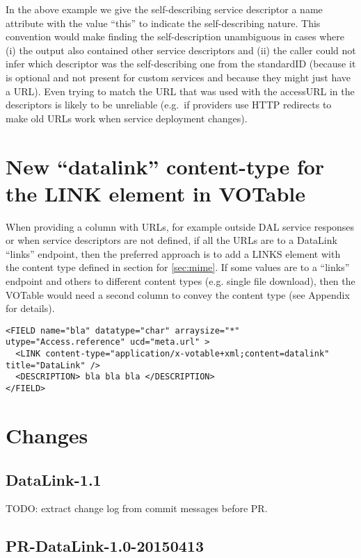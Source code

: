 \documentclass[11pt,a4paper]{ivoa}
\begin{document}
In the above example we give the self-describing service descriptor a
name attribute with the value ``this'' to indicate the self-describing
nature. This convention would make finding the self-description
unambiguous in cases where (i) the output also contained other service
descriptors and (ii) the caller could not infer which descriptor was
the self-describing one from the standardID (because it is optional
and not present for custom services and because they might just have a
URL). Even trying to match the URL that was used with the accessURL in
the descriptors is likely to be unreliable (e.g.\ if providers use HTTP
redirects to make old URLs work when service deployment changes).

\section{New ``datalink'' content-type for the LINK element in VOTable}


When providing a column with URLs, for example outside DAL service
responses or when service descriptors  are not defined, if all the
URLs are to a DataLink ``links'' endpoint, then the preferred approach
is to add a LINKS element with the content type defined in section for
\ref{sec:mime}. If some values are to a ``links'' endpoint and others to
different content types (e.g. single file download), then the VOTable
would need a second column to convey the content type (see Appendix
for details).

\begin{verbatim} 
<FIELD name="bla" datatype="char" arraysize="*" utype="Access.reference" ucd="meta.url" > 
  <LINK content-type="application/x-votable+xml;content=datalink" title="DataLink" /> 
  <DESCRIPTION> bla bla bla </DESCRIPTION> 
</FIELD>
\end{verbatim}


\section{Changes}

\subsection{DataLink-1.1}

TODO: extract change log from commit messages before PR.

\subsection{PR-DataLink-1.0-20150413}
\end{document}
